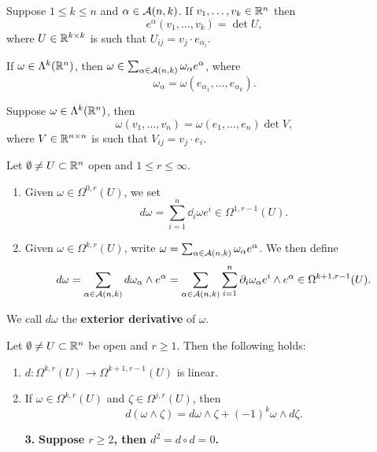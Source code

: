 \documentclass[a4paper]{article}
\begin{document}
\begin{cor}
Suppose $1 \leq k \leq n$ and $\alpha \in \mathcal{A}(n, k)$. 
If $v_1, \dots, v_k \in \mathbb{R}^n$ then 
\[
e^\alpha (v_1, \dots, v_k) = \det U,
\]
where $U \in \mathbb{R}^{k \times k}$ is such that 
$U_{ij} = v_j \cdot e_{\alpha_i}$.
\end{cor}

\begin{cor}
If $\omega \in \Lambda^k(\mathbb{R}^n)$, then $\omega \in \sum_{\alpha 
\in \mathcal{A}(n, k)} \omega_\alpha e^\alpha$, where 
\[
\omega_\alpha = \omega(e_{\alpha_1}, \dots, e_{\alpha_k}).
\]
\end{cor}

\begin{prop}
Suppose $\omega \in \Lambda^k(\mathbb{R}^n)$, then 
\[
\omega(v_1, \dots, v_n) = \omega(e_1, \dots, e_n) \det V,
\]
where $V \in \mathbb{R}^{n \times n}$ is such that 
$V_{ij} = v_j \cdot e_i$.
\end{prop}

\begin{defi}
Let $\emptyset \neq U \subset \mathbb{R}^n$ open and $1 \leq r \leq 
\infty$. 
\begin{enumerate}
\item Given $\omega \in \Omega^{0, r}(U)$, we set 
\[
d \omega = \sum_{i=1}^n \dd_i \omega e^i \in \Omega^{1, r-1}
(U).
\]
\item Given $\omega \in \Omega^{k, r}(U)$, write 
$\omega = \sum_{\alpha \in \mathcal{A}(n, k)} \omega_\alpha 
e^\alpha$. We then define 
\[
d \omega
= \sum_{\alpha \in \mathcal{A}(n, k)} d \omega_\alpha \wedge 
e^\alpha 
= \sum_{\alpha \in \mathcal{A}(n, k)} \sum_{i=1}^n 
\partial_i \omega_\alpha e^i \wedge e^\alpha 
\in \Omega^{k+1, r-1}(U).
\]
\end{enumerate}
We call $d \omega$ the \textbf{exterior derivative} of $\omega$.
\end{defi}

\begin{thm}
Let $\emptyset \neq U \subset \mathbb{R}^n$ be open and $r \geq 1$. 
Then the following holds: 
\begin{enumerate}
\item $d : \Omega^{k, r}(U) \to \Omega^{k+1, r-1} (U)$
is linear. 
\item If $\omega \in \Omega^{k, r}(U)$ and 
$\zeta \in \Omega^{j, r} (U)$, then 
\[
d (\omega \wedge \zeta) = d \omega \wedge \zeta 
+ (-1)^k \omega \wedge d \zeta.
\]
\item[\textbf{3.}] 
\textbf{Suppose $r \geq 2$, then $d^2 = d \circ d = 0$.}
\end{enumerate}
\end{thm}
\end{document}
